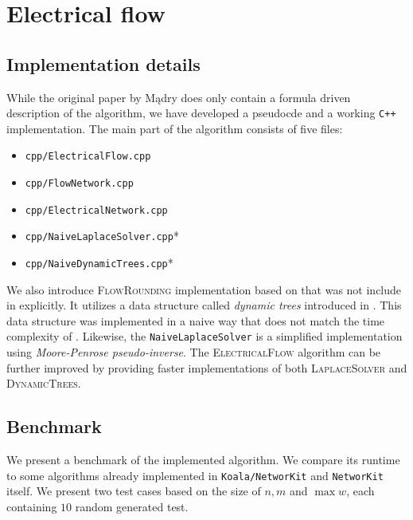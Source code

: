 \section{Electrical flow}
\subsection{Implementation details}
While the original paper by Mądry \cite{madry} does only contain a formula driven description of the algorithm, we have developed a pseudocde and a working \texttt{C++} implementation. The main part of the algorithm consists of five files:
\begin{itemize}
    \item \texttt{cpp/ElectricalFlow.cpp}
    \item \texttt{cpp/FlowNetwork.cpp}
    \item \texttt{cpp/ElectricalNetwork.cpp}
    \item \texttt{cpp/NaiveLaplaceSolver.cpp}*
    \item \texttt{cpp/NaiveDynamicTrees.cpp}*
\end{itemize}

We also introduce \textsc{FlowRounding} implementation based on \cite{flow_rounding} that was not include in \cite{madry} explicitly. It utilizes a data structure called \textit{dynamic trees} introduced in \cite{dynamic_trees}. This data structure was implemented in a naive way that does not match the time complexity of \cite{dynamic_trees}. Likewise, the \texttt{NaiveLaplaceSolver} is a simplified implementation using \textit{Moore-Penrose pseudo-inverse}. The \textsc{ElectricalFlow} algorithm can be further improved by providing faster implementations of both \textsc{LaplaceSolver} and \textsc{DynamicTrees}.  

\subsection{Benchmark}
We present a benchmark of the implemented algorithm. We compare its runtime to some algorithms already implemented in \texttt{Koala/NetworKit} and \texttt{NetworKit} itself. We present two test cases based on the size of $n, m$ and $\max w$, each containing $10$ random generated test.

